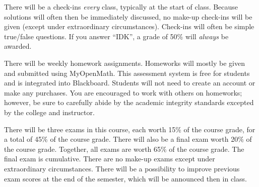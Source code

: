 \documentclass[11pt,letterpaper]{article}
\begin{document}
There will be a check-ins \textit{every} class, typically at the start of class. Because solutions will often then be immediately discussed, no make-up check-ins will be given (except under extraordinary circumstances). Check-ins will often be simple true/false questions. If you answer ``IDK'', a grade of 50\% will \textit{always} be awarded. \pspace


There will be weekly homework assignments. Homeworks will mostly be given and submitted using MyOpenMath. This assessment system is free for students and is integrated into Blackboard. Students will not need to create an account or make any purchases. You are encouraged to work with others on homeworks; however, be sure to carefully abide by the academic integrity standards excepted by the college and instructor. \pspace


There will be three exams in this course, each worth 15\% of the course grade, for a total of 45\% of the course grade. There will also be a final exam worth 20\% of the course grade. Together, all exams are worth 65\% of the course grade. The final exam is cumulative. There are no make-up exams except under extraordinary circumstances. There will be a possibility to improve previous exam scores at the end of the semester, which will be announced then in class. \pspace
\end{document}
